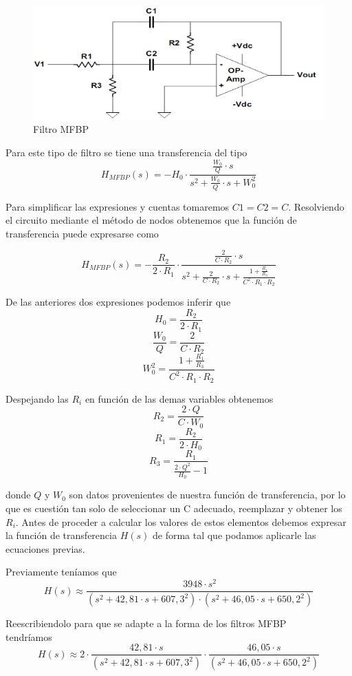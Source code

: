 \documentclass[11pt,a4paper]{report}
\begin{document}
\begin{figure}[h!]
\includegraphics[scale=0.9]{MFBP.png}
\caption{Filtro MFBP}
\end{figure}

Para este tipo de filtro se tiene una transferencia del tipo
\[H_{MFBP}(s) = -H_{0} \cdot \frac{\frac{W_{0}}{Q} \cdot s}{s^2 + \frac{W_{0}}{Q} \cdot s + W_{0}^2}\]

Para simplificar las expresiones y cuentas tomaremos $C1 = C2 = C$. Resolviendo el circuito mediante el método de nodos obtenemos que la función de transferencia puede expresarse como

\bigskip
\[H_{MFBP}(s) = -\frac{R_{2}}{2 \cdot R_{1}} \cdot \frac{\frac{2}{C \cdot R_{2}} \cdot s}{s^2 + \frac{2}{C \cdot R_{2}} \cdot s + \frac{1+\frac{R_{1}}{R_{3}}}{C^2 \cdot R_{1} \cdot R_{2}}}\]

De las anteriores dos expresiones podemos inferir que
\[H_{0} = \frac{R_{2}}{2 \cdot R_{1}}\]
\[\frac{W_{0}}{Q} = \frac{2}{C \cdot R_{2}}\]
\[W_{0}^2 = \frac{1+\frac{R_{1}}{R_{3}}}{C^2 \cdot R_{1} \cdot R_{2}}\]

Despejando las $R_{i}$ en función de las demas variables obtenemos
\[R_{2} = \frac{2 \cdot Q}{C \cdot W_{0}}\]
\[R_{1} = \frac{R_{2}}{2 \cdot H_{0}}\]
\[R_{3} = \frac{R_{1}}{\frac{2 \cdot Q^2}{H_{0}} - 1}\]

donde $Q$ y $W_{0}$ son datos provenientes de nuestra función de transferencia, por lo que es cuestión tan solo de seleccionar un C adecuado, reemplazar y obtener los $R_{i}$. Antes de proceder a calcular los valores de estos elementos debemos expresar 
la función de transferencia $H(s)$ de forma tal que podamos aplicarle las ecuaciones previas. 

\bigskip
Previamente teníamos que
\[H(s) \approx \frac{3948 \cdot s^2}{(s^2+42,81 \cdot s + 607,3^2)
\cdot (s^2+46,05 \cdot s + 650,2^2)}\]

Reescribiendolo para que se adapte a la forma de los filtros MFBP\\ tendríamos
\[H(s) \approx 2 \cdot \frac{42,81 \cdot s}{(s^2+42,81 \cdot s + 607,3^2)}
\cdot \frac{46,05 \cdot s}{(s^2+46,05 \cdot s + 650,2^2)}\]
\end{document}
